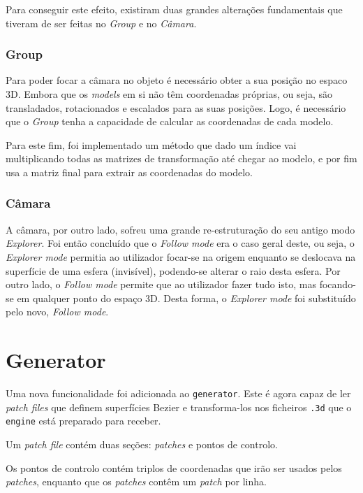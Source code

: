 \documentclass[a4paper]{article}
\begin{document}
Para conseguir este efeito, existiram duas grandes alterações fundamentais que tiveram de ser feitas no \textit{Group} e no
\textit{Câmara}.

\subsubsection{Group}

Para poder focar a câmara no objeto é necessário obter a sua posição no espaco 3D. Embora que os
\textit{models} em si não têm coordenadas próprias, ou seja, são transladados, rotacionados e escalados para as suas posições. Logo, é necessário que o \textit{Group} tenha a capacidade de calcular as coordenadas de cada modelo.

Para este fim, foi implementado um método que dado um índice vai multiplicando todas as matrizes de transformação até chegar ao modelo, e por fim usa a matriz final para extrair as coordenadas do modelo.


\subsubsection{Câmara}

A câmara, por outro lado, sofreu uma grande re-estruturação do seu antigo modo \textit{Explorer}.
Foi então concluído que o \textit{Follow mode} era o caso geral deste, ou seja, o \textit{Explorer mode}
permitia ao utilizador focar-se na origem enquanto se deslocava na superfície de uma esfera (invisível), podendo-se alterar o raio desta esfera. Por outro lado, o \textit{Follow mode} permite
que ao utilizador fazer tudo isto, mas focando-se em qualquer ponto do espaço 3D. Desta forma, o \textit{Explorer mode} foi substituído pelo novo, \textit{Follow mode}.

\section{Generator}

Uma nova funcionalidade foi adicionada ao \texttt{generator}. Este é agora capaz de ler \textit{patch files} que definem superfícies Bezier e transforma-los nos ficheiros \texttt{.3d} que o \texttt{engine} está preparado para receber.

Um \textit{patch file} contém duas seções: \textit{patches} e pontos de controlo.

Os pontos de controlo contém triplos de coordenadas que irão ser usados pelos \textit{patches}, enquanto que os \textit{patches} contêm um \textit{patch} por linha.
\end{document}
